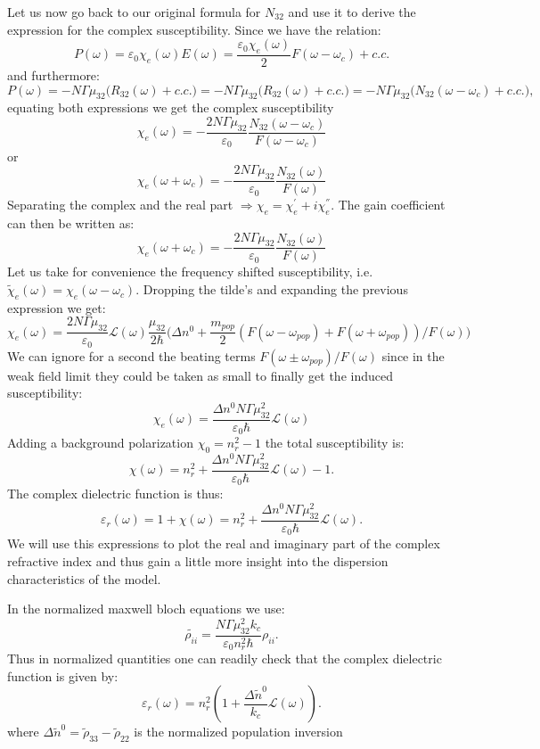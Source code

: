 \documentclass[10pt,english,fleqn]{article}%
\begin{document}
Let us now go back to our original formula for $N_{32}$ and use it to derive the expression for the complex susceptibility. Since we have the relation:
$$
P(\omega) = \varepsilon_0 \chi_e(\omega) E(\omega) =\frac{\varepsilon_0 \chi_e(\omega)}{2} F(\omega-\omega_c) +c.c.   
$$
and furthermore:
$$
P(\omega) = - N\Gamma\mu_{32}\big (R_{32}(\omega)+c.c.) = - N\Gamma\mu_{32}\big (R_{32}(\omega)+c.c.) =  - N\Gamma\mu_{32}\big (N_{32}(\omega-\omega_c)+c.c.) ,
$$
equating both expressions we get the complex susceptibility 
$$
\chi_e(\omega) = -\frac{2 N\Gamma \mu_{32}}{\varepsilon_0} \frac{N_{32}(\omega-\omega_c)}{F(\omega-\omega_c)} 
$$
or 
$$
\chi_e(\omega+\omega_c) = -\frac{2 N\Gamma \mu_{32}}{\varepsilon_0} \frac{N_{32}(\omega)}{F(\omega)} 
$$
Separating the complex and the real part $\Rightarrow \chi_e = \chi_e^{'} +i \chi_e^{''}$. The gain coefficient can then be written as:
$$
\chi_e(\omega+\omega_c) = -\frac{2 N\Gamma \mu_{32}}{\varepsilon_0} \frac{N_{32}(\omega)}{F(\omega)} 
$$
Let us take for convenience the frequency shifted susceptibility, i.e. $\tilde{\chi}_e(\omega) = \chi_e(\omega-\omega_c)$. Dropping the tilde's and expanding the previous expression we get:
$$
\chi_e(\omega) = \frac{2 N\Gamma \mu_{32}}{\varepsilon_0} \mathcal{L}(\omega)  \frac{\mu_{32}}{2\hbar}\Big (\Delta n^0  +\frac{m_{pop}}{2}  ( F(\omega-\omega_{pop} )+ F(\omega+\omega_{pop}))/F(\omega) \Big)
$$ 
We can ignore for a second the beating terms $F(\omega \pm \omega_{pop})/F(\omega)$ since in the weak field limit they could be taken as small to finally get the induced susceptibility:
$$
\chi_e(\omega) = \frac{\Delta n^0 N\Gamma \mu_{32}^2}{\varepsilon_0\hbar} \mathcal{L}(\omega)
$$ 
Adding a background polarization $\chi_0 = n_r^2-1$ the total susceptibility is:
$$
\chi(\omega) = n_r^2 +  \frac{\Delta n^0 N\Gamma \mu_{32}^2}{\varepsilon_0\hbar} \mathcal{L}(\omega) -1.
$$ 
The complex dielectric function is thus:
$$
\varepsilon_r(\omega) = 1+\chi(\omega) = n_r^2 +  \frac{\Delta n^0 N\Gamma \mu_{32}^2}{\varepsilon_0\hbar}\mathcal{L}(\omega).
$$ 
We will use this expressions to plot the real and imaginary part of the complex refractive index and thus gain a little more insight into the dispersion characteristics of the model.

In the normalized maxwell bloch equations we use:
$$
\tilde{\rho_{ii}} = \frac{N\Gamma\mu_{32}^2 k_c }{\varepsilon_0 n_r^2\hbar}\rho_{ii}.
$$ 
Thus in normalized quantities one can readily check that the complex dielectric function is given by:
$$
\varepsilon_r(\omega) = n_r^2(1 +  \frac{\Delta \tilde{n}^0}{k_c}\mathcal{L}(\omega)).
$$ 
where $\Delta \tilde{n}^0 = \tilde{\rho}_{33} - \tilde{\rho}_{22}$ is the normalized population inversion
\end{document}
